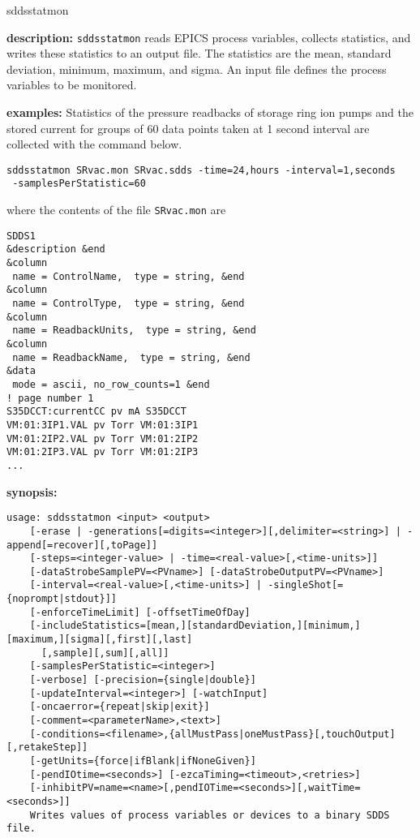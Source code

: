 \begin{sddsprog}{sddsstatmon}
\item \textbf{description:}
\verb+sddsstatmon+ reads EPICS process variables, collects statistics,
and writes these statistics to an output file.
The statistics are the mean, standard deviation, minimum, maximum, and sigma.
An input file defines the process variables to be monitored.
\item \textbf{examples:}
Statistics of the pressure readbacks of storage ring ion pumps and the stored current
for groups of 60 data points taken at 1 second interval are collected
with the command below.
\begin{verbatim}
sddsstatmon SRvac.mon SRvac.sdds -time=24,hours -interval=1,seconds 
 -samplesPerStatistic=60
\end{verbatim}
where the contents of the file \verb+SRvac.mon+ are
\begin{verbatim}
SDDS1
&description &end
&column
 name = ControlName,  type = string, &end
&column
 name = ControlType,  type = string, &end
&column
 name = ReadbackUnits,  type = string, &end
&column
 name = ReadbackName,  type = string, &end
&data
 mode = ascii, no_row_counts=1 &end
! page number 1
S35DCCT:currentCC pv mA S35DCCT
VM:01:3IP1.VAL pv Torr VM:01:3IP1
VM:01:2IP2.VAL pv Torr VM:01:2IP2
VM:01:2IP3.VAL pv Torr VM:01:2IP3
...
\end{verbatim}
\item \textbf{synopsis:}
\begin{verbatim}
usage: sddsstatmon <input> <output>
    [-erase | -generations[=digits=<integer>][,delimiter=<string>] | -append[=recover][,toPage]]
    [-steps=<integer-value> | -time=<real-value>[,<time-units>]]
    [-dataStrobeSamplePV=<PVname>] [-dataStrobeOutputPV=<PVname>]
    [-interval=<real-value>[,<time-units>] | -singleShot[={noprompt|stdout}]]
    [-enforceTimeLimit] [-offsetTimeOfDay]
    [-includeStatistics=[mean,][standardDeviation,][minimum,][maximum,][sigma][,first][,last]
      [,sample][,sum][,all]]
    [-samplesPerStatistic=<integer>]
    [-verbose] [-precision={single|double}]
    [-updateInterval=<integer>] [-watchInput]
    [-oncaerror={repeat|skip|exit}]
    [-comment=<parameterName>,<text>]
    [-conditions=<filename>,{allMustPass|oneMustPass}[,touchOutput][,retakeStep]]
    [-getUnits={force|ifBlank|ifNoneGiven}]
    [-pendIOtime=<seconds>] [-ezcaTiming=<timeout>,<retries>]
    [-inhibitPV=name=<name>[,pendIOTime=<seconds>][,waitTime=<seconds>]]
    Writes values of process variables or devices to a binary SDDS file.

\end{verbatim}
\end{sddsprog}
